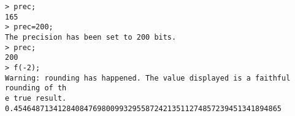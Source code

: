 \begin{center}\begin{minipage}{15cm}\begin{Verbatim}[frame=single]
> prec;
165
> prec=200;
The precision has been set to 200 bits.
> prec;
200
> f(-2);
Warning: rounding has happened. The value displayed is a faithful rounding of th
e true result.
0.4546487134128408476980099329558724213511274857239451341894865
\end{Verbatim}
\end{minipage}\end{center}
